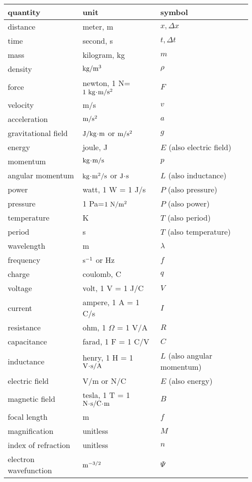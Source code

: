 \label{notationtable}
\noindent\begin{tabular}{|l|l|l|}
\hline
quantity	& unit	& symbol \\
\hline
distance	& meter, m	& $x, \Delta{}x$ \\
time	& second, s	& $t, \Delta{}t$ \\
mass	& kilogram, kg	& $m$ \\
density	& $\textup{kg}/\textup{m}^3$	& $\rho$  \\
force	& newton, 1 N=$1\ \kgunit\unitdot\munit/\sunit^2$	& $F$ \\
velocity	& m/s	& $v$ \\
acceleration	& $\textup{m}/\textup{s}^2$	& $a$ \\
gravitational field	& $\textup{J}/\textup{kg}\!\cdot\!\textup{m}$ or $\textup{m}/\textup{s}^2$	& $g$ \\
energy	& joule, J	& $E$ (also electric field)\\
momentum	& $\textup{kg}\!\cdot\!\textup{m}/\textup{s}$	& $p$ \\
angular momentum	& $\textup{kg}\!\cdot\!\textup{m}^2/\textup{s}$ or $\textup{J}\!\cdot\!\textup{s}$	& $L$ (also inductance)\\
power	& watt, 1 W = 1 J/s	& $P$ (also pressure) \\
pressure & 1 Pa=$1\ \nunit/\munit^2$	& $P$ (also power)\\
temperature	& K	& $T$ (also period)\\
period	& s	& $T$ (also temperature)\\
wavelength	& m	& $\lambda$ \\
frequency	& $\textup{s}^{-1}$ or Hz	& $f$ \\
charge	& coulomb, C	& $q$ \\
voltage	& volt, 1 V = 1 J/C	& $V$ \\
current	& ampere, 1 A = 1 C/s	& $I$ \\
resistance	& ohm, 1 $\Omega$ = 1 V/A	& $R$ \\
capacitance	& farad, 1 F = 1 C/V	& $C$ \\
inductance	& henry, 1 H = 1 $\textup{V}\!\cdot\!\textup{s}/\textup{A}$	& $L$ (also angular momentum)\\
electric field	& V/m or N/C	& $E$ (also energy)\\
magnetic field	& tesla, 1 T = 1 $\textup{N}\!\cdot\!\textup{s}/\textup{C}\!\cdot\!\textup{m}$	& $B$ \\
focal length	& m	& $f$ \\
magnification	& unitless	& $M$ \\
index of refraction	& unitless	& $n$ \\
electron wavefunction	& $\textup{m}^{-3/2}$	& $\Psi$ \\
\hline
\end{tabular}
